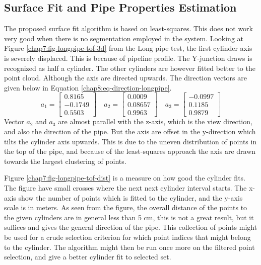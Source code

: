 \subsection{Surface Fit and Pipe Properties Estimation}
The proposed surface fit algorithm is based on least-squares. This does not work very good
when there is no segmentation employed in the system. Looking at Figure
\ref{chap7:fig-longpipe-tof-3d} from the Long pipe test, the first cylinder axis is severely displaced. This
is because of pipeline profile. The Y-junction draws is recognized as half a cylinder. The
other cylinders are however fitted better to the point cloud. Although the axis are
directed upwards. The direction vectors are given below in Equation
\eqref{chap8:eq-direction-longpipe}. 
\begin{equation}
    \label{chap8:eq-direction-longpipe}
    a_1 = \left[ \begin{matrix}
                        0.8165\\
                       -0.1749\\
                       0.5503 
                 \end{matrix} \right] \quad a_2 = \left [
                 \begin{matrix}
                       0.0009\\
                       0.08657\\
                       0.9963
                 \end{matrix} \right] \quad a_3 = \left [
                 \begin{matrix}
                       -0.0997\\
                       0.1185\\
                       0.9879
                 \end{matrix} \right]
\end{equation}
Vector $a_2$ and $a_3$ are almost parallel with the z-axis, which is the view direction,
and also the direction of the pipe. But the axis are offset in the y-direction which tilts
the cylinder axis upwards. This is due to the uneven distribution of points in the top of
the pipe, and because of the least-squares approach the axis are drawn towards the largest
clustering of points. 

Figure \ref{chap7:fig-longpipe-tof-dist} is a measure on how good the cylinder fits. The
figure have small crosses where the next next cylinder interval starts. The x-axis show
the number of points which is fitted to the cylinder, and the y-axis scale is in meters.
As seen from the figure, the overall distance of the points to the given cylinders are in
general less than 5 cm, this is not a great result, but it suffices and gives the general
direction of the pipe. This collection of points might be used for a crude selection
criterion for which point indices that might belong to the cylinder. The algorithm might
then be run once more on the filtered point selection, and give a better cylinder fit to
selected set. 

